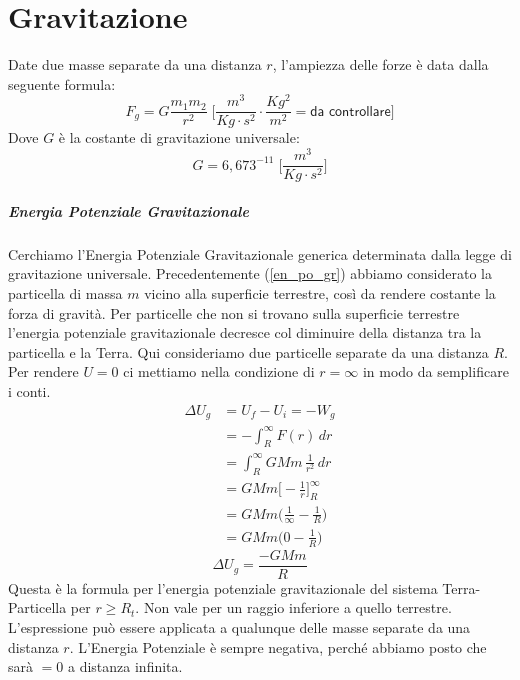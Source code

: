 \chapter{Gravitazione}

Date due masse separate da una distanza $r$, l'ampiezza delle forze è data 
dalla seguente formula:
\begin{equation}
    F_g = G\frac{m_1m_2}{r^2} \; \Bigg[\frac{m^3}{Kg\cdot s^2} \cdot
    \frac{Kg^2}{m^2} = \textsf{da controllare} \Bigg]
\end{equation}
Dove $G$ è la costante di gravitazione universale:
\begin{equation*}
    G = 6,673^{-11} \;\Bigg[\frac{m^3}{Kg\cdot s^2}\Bigg]
\end{equation*}
    
    \paragraph{Energia Potenziale Gravitazionale} Cerchiamo l'Energia 
    Potenziale Gravitazionale generica determinata dalla legge di gravitazione 
    universale. Precedentemente (\ref{en_po_gr}) abbiamo considerato la 
    particella di massa $m$ vicino alla superficie terrestre, così da rendere 
    costante la forza di gravità. Per particelle che non si trovano sulla 
    superficie terrestre l'energia potenziale gravitazionale decresce col 
    diminuire della distanza tra la particella e la Terra. Qui consideriamo 
    due particelle separate da una distanza $R$. Per rendere $U = 0$ ci 
    mettiamo nella condizione di $ r = \infty$ in modo da semplificare i conti.
    \begin{align*}
        \Delta U_g &= U_f - U_i = -W_g \\
        &= - \int_{R}^{\infty} F(r) \,dr \\
        &= \int_{R}^{\infty} GMm \, \frac{1}{r^2} \,dr \\
        &= GMm \bigg[-\frac{1}{r}\bigg]^{\infty}_{R} \\
        &= GMm\biggl(\frac{1}{\infty} - \frac{1}{R}\biggr) \\
        &= GMm\biggl(0 - \frac{1}{R}\biggr)
    \end{align*}
    \begin{equation}
        \Delta U_g = \frac{-GMm}{R}
    \end{equation}
    Questa è la formula per l'energia potenziale gravitazionale del sistema
    Terra-Particella per $r \geq R_t$. Non vale per un raggio inferiore a
    quello terrestre.
    L'espressione può essere applicata a qualunque delle masse separate da una
    distanza $r$. L'Energia Potenziale è sempre negativa, perché abbiamo posto
    che sarà $= 0$ a distanza infinita.

